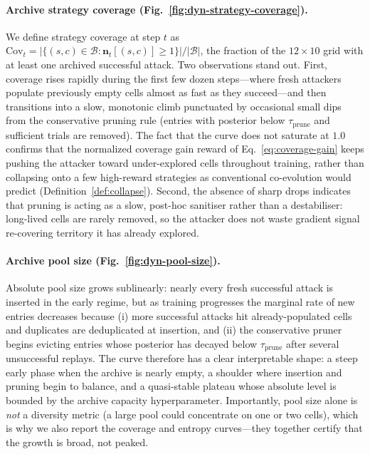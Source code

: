 \documentclass{article}
\newcommand{\strategyspace}{\mathcal{B}}
\begin{document}
\paragraph{Archive strategy coverage (Fig.~\ref{fig:dyn-strategy-coverage}).}
We define strategy coverage at step $t$ as $\mathrm{Cov}_t = |\{(s,c)\in\strategyspace : \mathbf{n}_t[(s,c)]\ge 1\}|/|\strategyspace|$, the fraction of the $12\times 10$ grid with at least one archived successful attack. Two observations stand out. First, coverage rises rapidly during the first few dozen steps---where fresh attackers populate previously empty cells almost as fast as they succeed---and then transitions into a slow, monotonic climb punctuated by occasional small dips from the conservative pruning rule (entries with posterior below $\tau_{\mathrm{prune}}$ and sufficient trials are removed). The fact that the curve does not saturate at $1.0$ confirms that the normalized coverage gain reward of Eq.~\ref{eq:coverage-gain} keeps pushing the attacker toward under-explored cells throughout training, rather than collapsing onto a few high-reward strategies as conventional co-evolution would predict (Definition~\ref{def:collapse}). Second, the absence of sharp drops indicates that pruning is acting as a slow, post-hoc sanitiser rather than a destabiliser: long-lived cells are rarely removed, so the attacker does not waste gradient signal re-covering territory it has already explored.

\paragraph{Archive pool size (Fig.~\ref{fig:dyn-pool-size}).}
Absolute pool size grows sublinearly: nearly every fresh successful attack is inserted in the early regime, but as training progresses the marginal rate of new entries decreases because (i) more successful attacks hit already-populated cells and duplicates are deduplicated at insertion, and (ii) the conservative pruner begins evicting entries whose posterior has decayed below $\tau_{\mathrm{prune}}$ after several unsuccessful replays. The curve therefore has a clear interpretable shape: a steep early phase when the archive is nearly empty, a shoulder where insertion and pruning begin to balance, and a quasi-stable plateau whose absolute level is bounded by the archive capacity hyperparameter. Importantly, pool size alone is \emph{not} a diversity metric (a large pool could concentrate on one or two cells), which is why we also report the coverage and entropy curves---they together certify that the growth is broad, not peaked.
\end{document}
